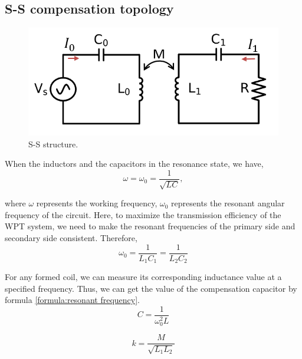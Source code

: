 \subsection{S-S compensation topology}

\begin{figure}[htbp]
    \centering
    \includegraphics[width=0.7\linewidth]{images/2_ss_scheme.png}
    \caption{S-S structure.}
    \label{fig:ss topology}
\end{figure}

When the inductors and the capacitors in the resonance state, we have,
\begin{equation}
    \omega=\omega _0=\frac{1}{\sqrt{LC}},
    \label{formula:resonant frequency}
\end{equation}

where $\omega$ represents the working frequency, $\omega _0$ represents the resonant angular frequency of the circuit. Here, to maximize the transmission efficiency of the WPT system, we need to make the resonant frequencies of the primary side and secondary side consistent. Therefore,
\begin{equation}
    \omega _0 = \frac{1}{L_1C_1} = \frac{1}{L_2C_2}
\end{equation}

For any formed coil, we can measure its corresponding inductance value at a specified frequency. Thus, we can get the value of the compensation capacitor by formula \ref{formula:resonant frequency}.
\begin{equation}
    C = \frac{1}{\omega_0^2 L}
\end{equation}

\begin{equation}
    k=\frac{M}{\sqrt{L_1L_2}}
\end{equation}


